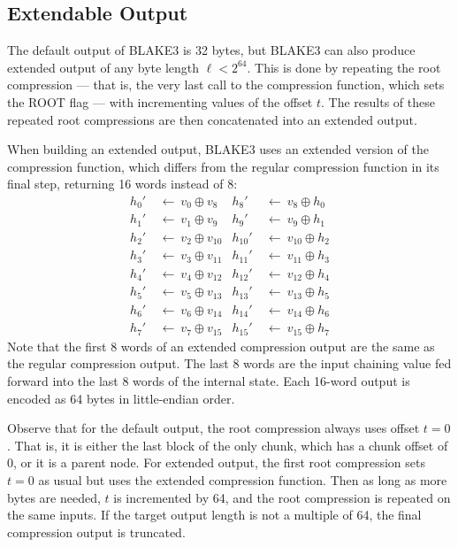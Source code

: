 \documentclass[11pt,notitlepage,a4paper]{article}
\begin{document}
\subsection{Extendable Output}\label{sec:extendable}

The default output of BLAKE3 is 32 bytes, but BLAKE3 can also produce extended
output of any byte length $\ell < 2^{64}$. This is done by repeating the root
compression --- that is, the very last call to the compression function, which
sets the ROOT flag --- with incrementing values of the offset $t$. The results
of these repeated root compressions are then concatenated into an extended
output.

When building an extended output, BLAKE3 uses an extended version of the
compression function, which differs from the regular compression function in
its final step, returning 16 words instead of 8:
\begin{align*}
    h_{0}'  \ & \leftarrow \ v_{0} \oplus  v_{8} &
    h_{8}'  \ & \leftarrow \ v_{8} \oplus  h_{0} \\
    h_{1}'  \ & \leftarrow \ v_{1} \oplus  v_{9} &
    h_{9}'  \ & \leftarrow \ v_{9} \oplus  h_{1} \\
    h_{2}'  \ & \leftarrow \ v_{2} \oplus  v_{10} &
    h_{10}' \ & \leftarrow \ v_{10} \oplus  h_{2} \\
    h_{3}'  \ & \leftarrow \ v_{3} \oplus  v_{11} &
    h_{11}' \ & \leftarrow \ v_{11} \oplus  h_{3} \\
    h_{4}'  \ & \leftarrow \ v_{4} \oplus  v_{12} &
    h_{12}' \ & \leftarrow \ v_{12} \oplus  h_{4} \\
    h_{5}'  \ & \leftarrow \ v_{5} \oplus  v_{13} &
    h_{13}' \ & \leftarrow \ v_{13} \oplus  h_{5} \\
    h_{6}'  \ & \leftarrow \ v_{6} \oplus  v_{14} &
    h_{14}' \ & \leftarrow \ v_{14} \oplus  h_{6} \\
    h_{7}'  \ & \leftarrow \ v_{7} \oplus  v_{15} &
    h_{15}' \ & \leftarrow \ v_{15} \oplus  h_{7}
\end{align*}
Note that the first 8 words of an extended compression output are the same as
the regular compression output. The last 8 words are the input chaining value
fed forward into the last 8 words of the internal state. Each 16-word output is
encoded as 64 bytes in little-endian order.

Observe that for the default output, the root compression always uses offset $t
= 0$. That is, it is either the last block of the only chunk, which has a chunk
offset of 0, or it is a parent node. For extended output, the first root
compression sets $t = 0$ as usual but uses the extended compression function.
Then as long as more bytes are needed, $t$ is incremented by 64, and the root
compression is repeated on the same inputs. If the target output length is not
a multiple of 64, the final compression output is truncated.
\end{document}
